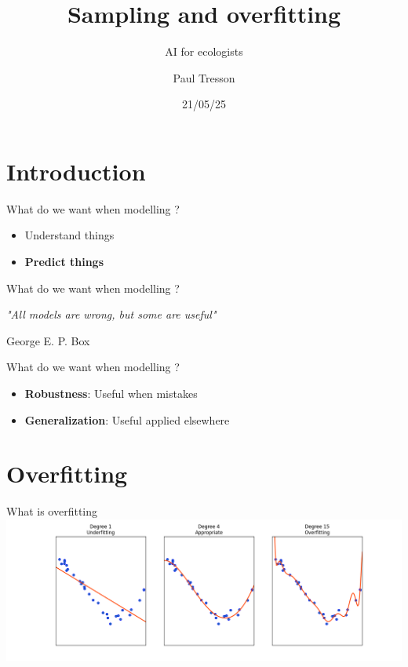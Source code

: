 \documentclass{irdbeamer}
\title{Sampling and overfitting}
\subtitle{AI for ecologists}
\author[Paul Tresson]{Paul Tresson}
\date{21/05/25} %
\begin{document}
\maketitle

\usebackgroundtemplate{}

\section{Introduction}

\begin{frame}{What do we want when modelling ?}
    \begin{itemize}
        \item<1-> Understand things
        \item<2-> \textbf{Predict things}
    \end{itemize}
\end{frame}

\begin{frame}{What do we want when modelling ?}
    
    \Large{
    \textit{
        "All models are wrong, but some are useful"
        }
    }

    \hfill George E. P. Box
\end{frame}

\begin{frame}{What do we want when modelling ?}
    \begin{itemize}
        \item \textbf{Robustness}: Useful when mistakes
        \item \textbf{Generalization}: Useful applied elsewhere
    \end{itemize}
\end{frame}

\section{Overfitting}

\begin{frame}{What is overfitting}
    \centering
    \includegraphics[width = .8\textwidth]{./figs/overfitting-overview.png}
\end{frame}
\end{document}
